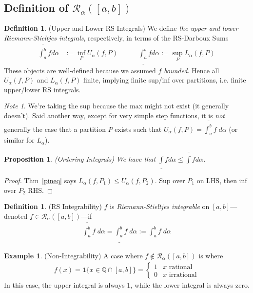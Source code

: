 \documentclass[12pt]{article}
\numberwithin{equation}{section} %
\theoremstyle{plain}
\newtheorem{prop}[thm]{Proposition}
\theoremstyle{definition}
\newtheorem{defn}[thm]{Definition}
\newtheorem{ex}[thm]{Example}
\theoremstyle{remark}
\newtheorem*{note}{Note}
\begin{document}
\subsection{Definition of $\mathscr{R}_\alpha([a,b])$}


\begin{defn}(Upper and Lower RS Integrals)
We define \emph{the upper and lower Riemann-Stieltjes integrals},
respectively, in terms of the RS-Darboux Sums
\begin{align*}
    \overline{\int^b_a} f d\alpha &:= \inf_P U_\alpha(f,P)
    \qquad\quad
    \underline{\int^b_a} f d\alpha := \sup_P L_\alpha(f,P)
\end{align*}
These objects are well-defined because we assumed $f$ \emph{bounded}.
Hence all $U_\alpha(f,P)$ and $L_\alpha(f,P)$ finite, implying finite
sup/inf over partitions, i.e. finite upper/lower RS integrals.
\end{defn}

\begin{note}
We're taking the sup because the max might not exist (it generally
doesn't). Said another way, except for very simple step functions, it is
\emph{not} generally the case that a partition $P$ exists such that
$U_\alpha(f,P)=\overline{\int^b_a} f\; d\alpha$ (or similar for
$L_\alpha$).
\end{note}

\begin{prop}\emph{(Ordering Integrals)}
\label{intineq}
We have that
$\underline{\int} f d\alpha \leq \overline{\int} f d\alpha$.
\end{prop}
\begin{proof}
Thm~\ref{pineq} says
$L_\alpha(f,P_1) \leq U_\alpha(f,P_2)$.
Sup over $P_1$ on LHS, then inf over $P_2$ RHS.
\end{proof}


\begin{defn}(RS Integrability)
$f$ is \emph{Riemann-Stieltjes integrable} on $[a,b]$---denoted
$f \in \mathscr{R}_\alpha([a,b])$---if
\begin{align*}
  \overline{\int^b_a} f \;d\alpha  =
  \underline{\int^b_a} f \;d\alpha
  := {\int^b_a} f \;d\alpha
\end{align*}
\end{defn}

\begin{ex}(Non-Integrability)
A case where $f \notin \mathscr{R}_\alpha([a,b])$ is where
\begin{align*}
  f(x) = \mathbf{1}\{x\in \mathbb{Q}\cap [a,b]\}
    =\begin{cases} 1 & x\text{ rational} \\
        0 & x\text{ irrational} \end{cases}
\end{align*}
In this case, the upper integral is always 1, while the lower integral
is always zero.
\end{ex}
\end{document}
